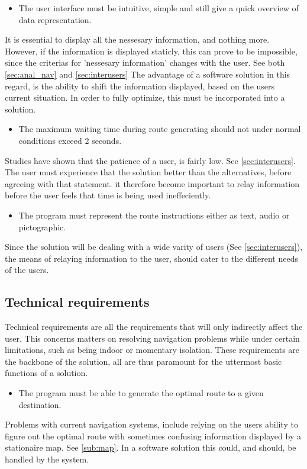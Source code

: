\begin{itemize}
	\item The user interface must be intuitive, simple and still give a quick overview of data representation.
\end{itemize}
It is essential to display all the nessesary information, and nothing more. However, if the information is displayed staticly, this can prove to be impossible, since the criterias for 'nessesary information' changes with the user. See both \cref{sec:anal_nav} and \cref{sec:interusers} The advantage of a software solution in this regard, is the ability to shift the information displayed, based on the users current situation. In order to fully optimize, this must be incorporated into a solution.

\begin{itemize}
	\item The maximum waiting time during route generating should not under normal conditions exceed 2 seconds.
\end{itemize}
Studies have shown that the patience of a user, is fairly low. See \cref{sec:interusers}. The user must experience that the solution better than the alternatives, before agreeing with that statement. it therefore become important to relay information before the user feels that time is being used ineffeciently.

\begin{itemize}
	\item The program must represent the route instructions either as text, audio or pictographic.
\end{itemize}
Since the solution will be dealing with a wide varity of users (See \cref{sec:interusers}), the means of relaying information to the user, should cater to the different needs of the users.


\subsection{Technical requirements}

Technical requirements are all the requirements that will only indirectly affect the user. This concerns matters on resolving navigation problems while under certain limitations, such as being indoor or momentary isolation. These requirements are the backbone of the solution, all are thus paramount for the uttermost basic functions of a solution.

\begin{itemize}
	\item The program must be able to generate the optimal route to a given destination.
\end{itemize}
Problems with current navigation systems, include relying on the users ability to figure out the optimal route with sometimes confusing information displayed by a stationaire map. See \cref{sub:map}. In a software solution this could, and should, be handled by the system.

